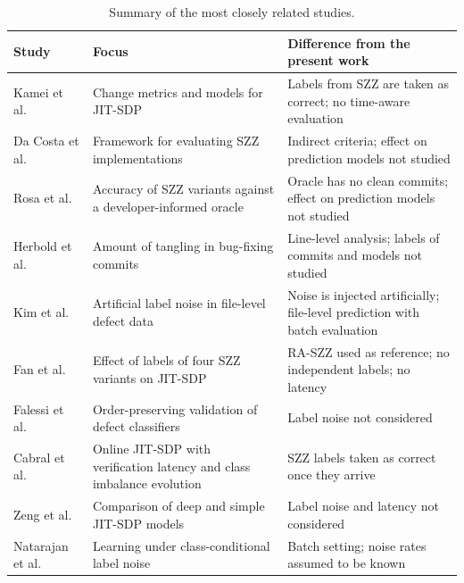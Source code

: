 \documentclass[12pt,a4paper,oneside]{report}
\begin{document}
\begin{table}[htbp]
\centering\footnotesize
\setlength{\tabcolsep}{4pt}
\caption{Summary of the most closely related studies.}
\label{tab:litsummary}
\begin{tabularx}{\linewidth}{@{}>{\raggedright\arraybackslash}p{27mm}>{\raggedright\arraybackslash}p{40mm}>{\raggedright\arraybackslash}X@{}}
\toprule
Study & Focus & Difference from the present work \\
\midrule
Kamei et al.~\cite{kamei2013jit} & Change metrics and models for JIT-SDP &
Labels from SZZ are taken as correct; no time-aware evaluation \\
Da Costa et al.~\cite{dacosta2017maszz} & Framework for evaluating SZZ
implementations & Indirect criteria; effect on prediction models not studied \\
Rosa et al.~\cite{rosa2021oracle,rosa2023szzvariants} & Accuracy of SZZ
variants against a developer-informed oracle & Oracle has no clean commits;
effect on prediction models not studied \\
Herbold et al.~\cite{herbold2022tangling} & Amount of tangling in bug-fixing
commits & Line-level analysis; labels of commits and models not studied \\
Kim et al.~\cite{kim2011noise} & Artificial label noise in file-level defect
data & Noise is injected artificially; file-level prediction with batch evaluation \\
Fan et al.~\cite{fan2021mislabeled} & Effect of labels of four SZZ variants on
JIT-SDP & RA-SZZ used as reference; no independent labels; no latency \\
Falessi et al.~\cite{falessi2020order} & Order-preserving validation of defect
classifiers & Label noise not considered \\
Cabral et al.~\cite{cabral2019orb} & Online JIT-SDP with verification latency
and class imbalance evolution & SZZ labels taken as correct once they arrive \\
Zeng et al.~\cite{zeng2021lapredict} & Comparison of deep and simple JIT-SDP
models & Label noise and latency not considered \\
Natarajan et al.~\cite{natarajan2013noisy} & Learning under class-conditional
label noise & Batch setting; noise rates assumed to be known \\
\bottomrule
\end{tabularx}
\end{table}

\end{document}
